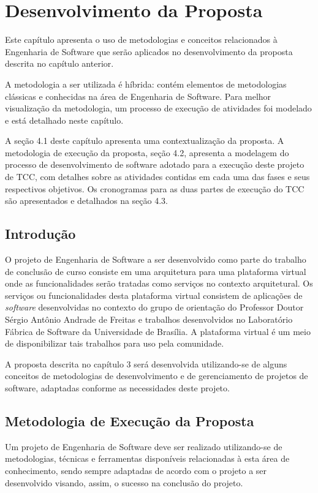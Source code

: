 \chapter[Desenvolvimento da Proposta]{Desenvolvimento da Proposta}

Este capítulo apresenta o uso de metodologias e conceitos relacionados à Engenharia de Software que serão aplicados no desenvolvimento da proposta descrita no capítulo anterior.

A metodologia a ser utilizada é híbrida: contém elementos de metodologias clássicas e conhecidas na área de Engenharia de Software. Para melhor visualização da metodologia, um processo de execução de atividades foi modelado e está detalhado neste capítulo.

A seção 4.1 deste capítulo apresenta uma contextualização da proposta. A metodologia de execução da proposta, seção 4.2, apresenta a modelagem do processo de desenvolvimento de software adotado para a execução deste projeto de TCC, com detalhes sobre as atividades contidas em cada uma das fases e seus respectivos objetivos. Os cronogramas para as duas partes de execução do TCC são apresentados e detalhados na seção 4.3.

\section{Introdução}
O projeto de Engenharia de Software a ser desenvolvido como parte do trabalho de conclusão de curso consiste em uma arquitetura para uma plataforma virtual onde as funcionalidades serão tratadas como serviços no contexto arquitetural. Os serviços ou funcionalidades desta plataforma virtual consistem de aplicações de \textit{software} desenvolvidas no contexto do grupo de orientação do Professor Doutor Sérgio Antônio Andrade de Freitas e trabalhos desenvolvidos no Laboratório Fábrica de Software da Universidade de Brasília. A plataforma virtual é um meio de disponibilizar tais trabalhos para uso pela comunidade.

A proposta descrita no capítulo 3 será desenvolvida utilizando-se de alguns conceitos de metodologias de desenvolvimento e de gerenciamento de projetos de software, adaptadas conforme as necessidades deste projeto.

\section{Metodologia de Execução da Proposta}
Um projeto de Engenharia de Software deve ser realizado utilizando-se de metodologias, técnicas e ferramentas disponíveis relacionadas à esta área de conhecimento, sendo sempre adaptadas de acordo com o projeto a ser desenvolvido visando, assim, o sucesso na conclusão do projeto.

